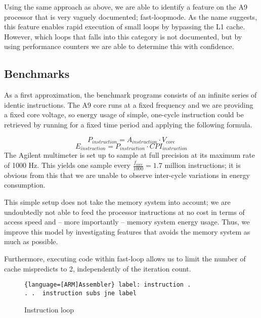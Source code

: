 Using the same approach as above, we are able to identify a feature on the A9
processor that is very vaguely documented; fast-loop\texttrademark mode. As the
name suggests, this feature enables rapid execution of small loops by bypassing
the L1 cache.  However, which loops that falls into this category is not
documented, but by using performance counters we are able to determine this with
confidence.  


\subsection{Benchmarks} As a first approximation, the benchmark programs
consists of an infinite series of identic instructions. The A9 core runs at a
fixed frequency and we are providing a fixed core voltage, so energy usage of
simple, one-cycle instruction could be retrieved by running for a fixed time
period and applying the following formula.

 \begin{equation} P_{instruction} = A_{instruction} \cdot
    V_{core} \end{equation} \begin{equation} E_{instruction} = P_{instruction}
    \cdot CPI_{instruction} \end{equation} The Agilent multimeter is set up to
sample at full precision at its maximum rate of 1000 Hz. This yields one sample
every $\frac{ f_{core} }{ 1000 } = 1.7$ million instructions; it is obvious from
this that we are unable to observe inter-cycle variations in energy consumption.

This simple setup does not take the memory system into account; we are
undoubtedly not able to feed the processor instructions at no cost in terms of
access speed and -- more importantly -- memory system energy usage. Thus, we
improve this model by investigating features that avoids the memory system as
much as possible.

Furthermore, executing code within fast-loop allows us to limit the number of
cache mispredicts to 2, independently of the iteration count.

\begin{figure} \begin{lstlisting}{language=[ARM]Assembler} label: instruction .
. .  instruction subs jne label \end{lstlisting} \caption{Instruction loop}
\label{list:inst_loop} \end{figure}

